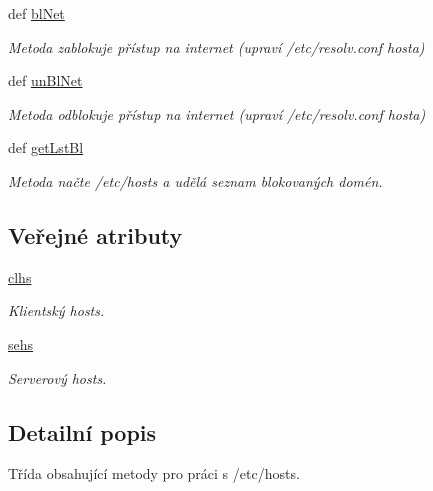\begin{DoxyCompactItemize}
def \hyperlink{classfwSetUp_1_1fwSetUp_a4d21f86d17c54919fbdc2e3f069fa471}{bl\-Net}
\begin{DoxyCompactList}\small\item\em Metoda zablokuje přístup na internet (upraví /etc/resolv.conf hosta) \end{DoxyCompactList}\item 
def \hyperlink{classfwSetUp_1_1fwSetUp_a4f770f10b81c0030b1753dfb60452045}{un\-Bl\-Net}
\begin{DoxyCompactList}\small\item\em Metoda odblokuje přístup na internet (upraví /etc/resolv.conf hosta) \end{DoxyCompactList}\item 
def \hyperlink{classfwSetUp_1_1fwSetUp_a9d56382f2c43c78f6dcf2057580a5ed2}{get\-Lst\-Bl}
\begin{DoxyCompactList}\small\item\em Metoda načte /etc/hosts a udělá seznam blokovaných domén. \end{DoxyCompactList}\end{DoxyCompactItemize}
\subsection*{Veřejné atributy}
\begin{DoxyCompactItemize}
\item 
\hypertarget{classfwSetUp_1_1fwSetUp_adf3bfb3c9578fb497292ececbf5497f7}{\hyperlink{classfwSetUp_1_1fwSetUp_adf3bfb3c9578fb497292ececbf5497f7}{clhs}}\label{dd/dd2/classfwSetUp_1_1fwSetUp_adf3bfb3c9578fb497292ececbf5497f7}

\begin{DoxyCompactList}\small\item\em Klientský hosts. \end{DoxyCompactList}\item 
\hypertarget{classfwSetUp_1_1fwSetUp_a98fdb43a4b9d6104ac4b4dc3d77dadcd}{\hyperlink{classfwSetUp_1_1fwSetUp_a98fdb43a4b9d6104ac4b4dc3d77dadcd}{sehs}}\label{dd/dd2/classfwSetUp_1_1fwSetUp_a98fdb43a4b9d6104ac4b4dc3d77dadcd}

\begin{DoxyCompactList}\small\item\em Serverový hosts. \end{DoxyCompactList}\end{DoxyCompactItemize}


\subsection{Detailní popis}
Třída obsahující metody pro práci s /etc/hosts. 

